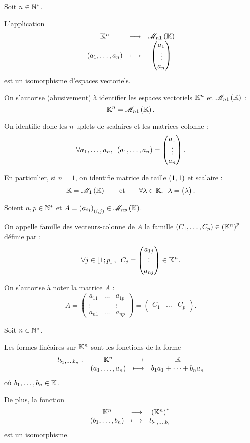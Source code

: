 \begin{abus}[Matrice-colonne \(=\) vecteur]
Soit \(n\in\mathbb{N}^*\).

L'application \[\fonctionlambda{\K^n}{\M{n1}}{\paren{a_1,\dots,a_n}}{\begin{pmatrix}
a_1 \\
\vdots \\
a_n
\end{pmatrix}}\] est un isomorphisme d'espaces vectoriels.

On s'autorise (abusivement) à identifier les espaces vectoriels \(\mathbb{K}^n\) et \(\M{n1}\) : \[\K^n=\M{n1}.\]

On identifie donc les \(n\)-uplets de scalaires et les matrices-colonne : \[\quantifs{\forall a_1,\dots,a_n}\paren{a_1,\dots,a_n}=\begin{pmatrix}
a_1 \\
\vdots \\
a_n
\end{pmatrix}.\]

En particulier, si \(n=1\), on identifie matrice de taille \(\left(1,1\right)\) et scalaire : \[\K=\M{1}\qquad\text{et}\qquad\quantifs{\forall\lambda\in\K}\lambda=\begin{pmatrix}
\lambda
\end{pmatrix}.\]
\end{abus}

\begin{defi}
Soient \(n,p\in\mathbb{N}^*\) et \(A=\paren{a_{ij}}_{\paren{i,j}}\in\M{np}\).

On appelle famille des vecteurs-colonne de \(A\) la famille \(\left(C_1,\dots,C_p\right)\in\left(\mathbb{K}^n\right)^p\) définie par : \[\quantifs{\forall j\in\interventierii{1}{p}}C_j=\begin{pmatrix}
a_{1j} \\
\vdots \\
a_{nj}
\end{pmatrix}\in\K^n.\]

On s'autorise à noter la matrice \(A\)  : \[A=\begin{pmatrix}
a_{11} & \dots & a_{1p} \\
\vdots &  & \vdots \\
a_{n1} & \dots & a_{np}
\end{pmatrix}=\begin{pmatrix}
C_1 & \dots & C_p
\end{pmatrix}.\]
\end{defi}

\begin{rappel}
Soit \(n\in\mathbb{N}^*\).

Les formes linéaires sur \(\mathbb{K}^n\) sont les fonctions de la forme \[\begin{array}[t]{cccc}l_{b_1,\dots,b_n} : & \mathbb{K}^n & \longrightarrow & \mathbb{K} \\ & \left(a_1,\dots,a_n\right) & \longmapsto & b_1a_1+\dots+b_na_n\end{array}\] où \(b_1,\dots,b_n\in\mathbb{K}\).

De plus, la fonction \[\begin{array}[t]{ccc}\mathbb{K}^n & \longrightarrow & \left(\mathbb{K}^n\right)^{*} \\ \left(b_1,\dots,b_n\right) & \longmapsto & l_{b_1,\dots,b_n}\end{array}\] est un isomorphisme.
\end{rappel}

